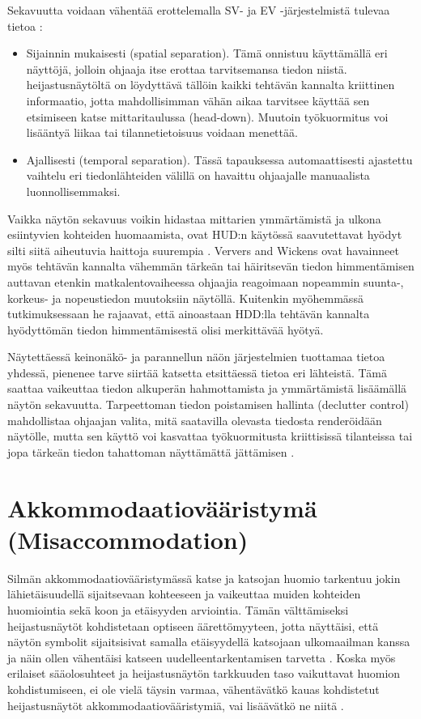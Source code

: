 \documentclass[utf8,bachelor,manualbib]{gradu3}
\begin{document}
Sekavuutta voidaan vähentää erottelemalla SV- ja EV -järjestelmistä tulevaa tietoa \citep{baileyym2007}:

\begin{itemize}
\item Sijainnin mukaisesti (spatial separation).
Tämä onnistuu käyttämällä eri näyttöjä, jolloin ohjaaja itse erottaa tarvitsemansa tiedon niistä. heijastusnäytöltä on löydyttävä tällöin kaikki tehtävän kannalta kriittinen informaatio, jotta mahdollisimman vähän aikaa  tarvitsee käyttää sen etsimiseen katse mittaritaulussa (head-down). Muutoin työkuormitus voi lisääntyä liikaa tai tilannetietoisuus voidaan menettää.
\item Ajallisesti (temporal separation).
Tässä tapauksessa automaattisesti ajastettu vaihtelu eri tiedonlähteiden välillä on havaittu ohjaajalle manuaalista luonnollisemmaksi.
\end{itemize}

Vaikka näytön sekavuus voikin hidastaa mittarien ymmärtämistä ja ulkona esiintyvien kohteiden huomaamista, ovat HUD:n käytössä saavutettavat hyödyt silti siitä aiheutuvia haittoja suurempia \citep{ververswickens1998}. Ververs and Wickens \citeyearpar{ververswickens1996} ovat havainneet myös tehtävän kannalta vähemmän tärkeän tai häiritsevän tiedon himmentämisen auttavan etenkin matkalentovaiheessa ohjaajia reagoimaan nopeammin suunta-, korkeus- ja nopeustiedon muutoksiin näytöllä. Kuitenkin myöhemmässä tutkimuksessaan \citeyearpar{ververswickens1998} he rajaavat, että ainoastaan HDD:lla tehtävän kannalta hyödyttömän tiedon himmentämisestä olisi merkittävää hyötyä.

Näytettäessä keinonäkö- ja parannellun näön järjestelmien tuottamaa tietoa yhdessä, pienenee tarve siirtää katsetta etsittäessä tietoa eri lähteistä. Tämä saattaa vaikeuttaa tiedon alkuperän hahmottamista ja ymmärtämistä lisäämällä näytön sekavuutta. Tarpeettoman tiedon poistamisen hallinta (declutter control) mahdollistaa ohjaajan valita, mitä saatavilla olevasta tiedosta renderöidään näytölle, mutta sen käyttö voi kasvattaa työkuormitusta kriittisissä tilanteissa tai jopa tärkeän tiedon tahattoman näyttämättä jättämisen \citep{baileyym2007}.

\section{Akkommodaatiovääristymä (Misaccommodation)}

Silmän akkommodaatiovääristymässä katse ja katsojan huomio tarkentuu jokin lähietäisuudellä sijaitsevaan kohteeseen ja vaikeuttaa muiden kohteiden huomiointia sekä koon ja etäisyyden arviointia. Tämän välttämiseksi heijastusnäytöt kohdistetaan optiseen äärettömyyteen, jotta näyttäisi, että näytön symbolit sijaitsisivat samalla etäisyydellä katsojaan ulkomaailman kanssa ja näin ollen vähentäisi katseen uudelleentarkentamisen tarvetta \citep{naish1964}. Koska myös erilaiset sääolosuhteet ja heijastusnäytön tarkkuuden taso vaikuttavat huomion kohdistumiseen, ei ole vielä täysin varmaa, vähentävätkö kauas kohdistetut heijastusnäytöt akkommodaatiovääristymiä, vai lisäävätkö ne niitä \citep{crawfordneal2006}.
\end{document}
